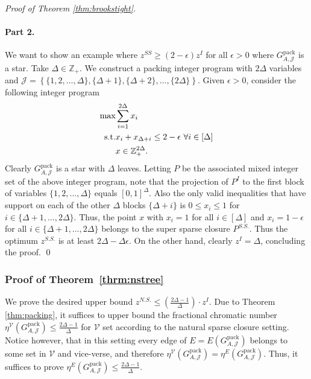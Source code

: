 \documentclass[smallextended]{svjour3}
\begin{document}
\begin{proof}[Proof of Theorem \ref{thm:brookstight}]
	\paragraph{Part 2.} 
	We want to show an example where $z^{SS} \geq (2 - \epsilon) z^I$ for all $\epsilon >0$ where ${G^{\textrm{pack}}_{A, {\mathcal{J}}}}$ is a star.
	Take $\Delta \in \mathbb{Z}_{+}$. We construct a packing integer program with $2\Delta$ variables and $\mathcal{J} = \left\{\{1, 2, \dots, \Delta\}, \{\Delta + 1\}, \{\Delta + 2\}, \dots, \{2\Delta\}\right\}$. Given $\epsilon > 0$, consider the following integer program
\begin{eqnarray*}
\textup{max}& \sum_{i = 1}^{2\Delta} x_i\\
\textup{s.t.}& x_i + x_{\Delta + i} \leq 2 - \epsilon \ \forall i \in [\Delta]\\
&x \in \mathbb{Z}^{2\Delta}_{+}.
\end{eqnarray*}
Clearly ${G^{\textrm{pack}}_{A, {\mathcal{J}}}}$ is a star with $\Delta$ leaves. Letting $P$ be the associated mixed integer set of the above integer program, note that the projection of $P^{I}$ to the first block of variables $\{1, 2, \ldots, \Delta\}$ equals $[0, 1]^{\Delta}$. Also the only valid inequalities that have support on each of the other $\Delta$ blocks $\{\Delta + i\}$ is $0 \leq x_i \leq 1$ for $i \in \{\Delta + 1, \dots, 2\Delta\}$. Thus, the point $x$ with $x_i = 1$ for all $i \in [\Delta]$ and $x_i = 1- \epsilon$ for all $i \in \{\Delta + 1, \dots, 2\Delta\}$ belongs to the super sparse closure $P^{S.S.}$. Thus the optimum $z^{S.S.}$ is at least $2\Delta - \Delta\epsilon$. On the other hand, clearly $z^{I} = \Delta$, concluding the proof.{
\ifmp
	\hfill \qed
\fi
}
\end{proof}

\subsubsection{Proof of Theorem~\ref{thrm:nstree}}

 We prove the desired upper bound $z^{N.S.} \leq \left(\frac{2\Delta-1}{\Delta} \right) \cdot z^I$. Due to Theorem \ref{thm:packing}, it suffices to upper bound the fractional chromatic number $\eta^{\mathcal{V}}({G^{\textrm{pack}}_{A, {\mathcal{J}}}}) \le \frac{2\Delta-1}{\Delta}$ for ${\mathcal{V}}$ set according to the natural sparse closure setting. Notice however, that in this setting every edge of $E = E({G^{\textrm{pack}}_{A, {\mathcal{J}}}})$ belongs to some set in ${\mathcal{V}}$ and vice-verse, and therefore $\eta^{\mathcal{V}}({G^{\textrm{pack}}_{A, {\mathcal{J}}}}) = \eta^E({G^{\textrm{pack}}_{A, {\mathcal{J}}}})$. Thus, it suffices to prove $\eta^E({G^{\textrm{pack}}_{A, {\mathcal{J}}}}) \le \frac{2\Delta-1}{\Delta}$.
\end{document}
